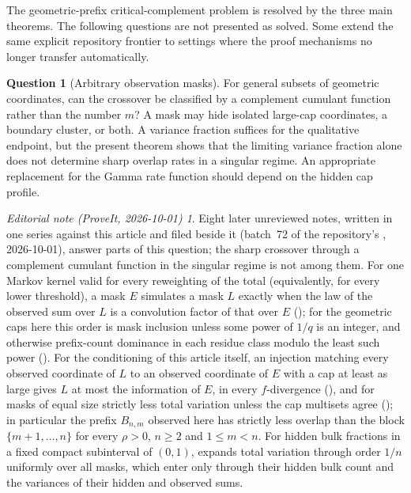 \documentclass[11pt,a4paper]{article}
\numberwithin{equation}{section}
\theoremstyle{definition}
\newtheorem{question}{Question}
\theoremstyle{remark}
\newtheorem*{ednotelater}{Editorial note (ProveIt, 2026-10-01)}
\begin{document}
The geometric-prefix critical-complement problem is resolved by the
three main theorems. The following questions are not presented as solved.
Some extend the same explicit repository frontier to settings where the
proof mechanisms no longer transfer automatically.

\begin{question}[Arbitrary observation masks]
For general subsets of geometric coordinates, can the crossover be
classified by a complement cumulant function rather than the number
$m$? A mask may hide isolated large-cap coordinates, a boundary cluster,
or both. A variance fraction suffices for the qualitative endpoint,
but the present theorem shows that the limiting variance fraction alone
does not determine
sharp overlap rates in a singular regime. An appropriate replacement
for the Gamma rate function should depend on the hidden cap profile.
\end{question}
\begin{ednotelater}
Eight later unreviewed notes, written in one series against this article and
filed beside it (batch~72 of the repository's , 2026-10-01), answer parts of
this question; the sharp crossover through a complement cumulant function in
the singular regime is not among them. For one Markov kernel valid for every
reweighting of the total (equivalently, for every lower threshold), a mask $E$
simulates a mask $L$ exactly when the law of the observed sum over $L$ is a
convolution factor of that over $E$
(); for the geometric caps here this
order is mask inclusion unless some power of $1/q$ is an integer, and
otherwise prefix-count dominance in each residue class modulo the least such
power (). For the conditioning of
this article itself, an injection matching every observed coordinate of $L$ to
an observed coordinate of $E$ with a cap at least as large gives $L$ at most
the information of $E$, in every $f$-divergence
(), and for masks of equal size
strictly less total variation unless the cap multisets agree
(); in particular the prefix
$B_{n,m}$ observed here has strictly less overlap than the block
$\{m+1,\ldots,n\}$ for every $\rho>0$, $n\ge2$ and $1\le m<n$. For hidden bulk
fractions in a fixed compact subinterval of $(0,1)$,
 expands total variation through
order $1/n$ uniformly over all masks, which enter only through their hidden
bulk count and the variances of their hidden and observed sums.
\end{ednotelater}
\end{document}
